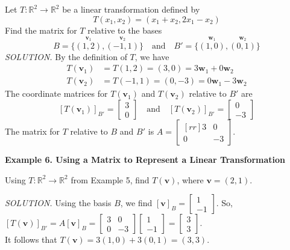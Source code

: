 \documentclass{article}
\newcommand\R{\mathbb{R}}
\begin{document}
    Let $T: \R^2 \to \R^2 $ be a linear transformation defined by 
    \[T(x_1,x_2) = (x_1 + x_2, 2x_1 - x_2) \]
    Find the matrix for $T$ relative to the bases
    \[B = \{ \overset{ \textbf{v}_1 }{(1,2)}, \overset{ \textbf{v}_2 }{(-1,1)} \} \quad \text{and} \quad
        B' = \{ \overset{ \textbf{w}_1 }{(1,0)}, \overset{ \textbf{w}_2 }{(0,1)} \}\]
    \textit{\textcolor{blue5}{SOLUTION.}} By the definition of $T$, we have
    \begin{equation*}
        \begin{split}
            T( \textbf{v}_1 ) &= T(1,2) = (3,0) = 3\textbf{w}_1 + 0 \textbf{w}_2 \\
            T( \textbf{v}_2 ) &= T(-1,1) = (0,-3) = 0 \textbf{w}_1 - 3 \textbf{w}_2
        \end{split}
    \end{equation*}
    The coordinate matrices for $T( \textbf{v}_1 )$ and $T( \textbf{v}_2 )$ relative to $B'$ are
   \[[T( \textbf{v}_1 )]_{B'}  = \begin{bmatrix}
       3 \\ 0
   \end{bmatrix}  \quad \text{and} \quad 
   [T( \textbf{v}_2 )]_{B'}  = \begin{bmatrix}
       0 \\ -3
   \end{bmatrix}\]
   The matrix for $T$ relative to $B$ and $B'$ is $A = \begin{bmatrix}[rr]
       3 & 0 \\ 0 & -3
   \end{bmatrix}$.

   \textbf{Example 6. \textcolor{blue5}{Using a Matrix to Represent a Linear Transformation}}

   Using $T: \R^2  \to \R^2 $ from Example 5, find $T( \textbf{v} ) $, where $ \textbf{v} = (2,1)$.

   \textit{\textcolor{blue5}{SOLUTION.}} Using the basis $B$, we find $[ \textbf{v} ]_B = \begin{bmatrix}
       1 \\ -1
   \end{bmatrix}$. So,$[T( \textbf{v} )]_{B'} = A[ \textbf{v} ]_B = 
   \begin{bmatrix}
       3 & 0 \\ 0 & -3
   \end{bmatrix} \begin{bmatrix}
       1 \\ -1
   \end{bmatrix} = \begin{bmatrix}
       3 \\ 3
   \end{bmatrix}$.\\
   It follows that $T( \textbf{v} ) = 3(1,0) + 3(0,1) = (3,3)$.
\end{document}
